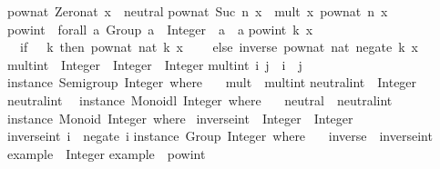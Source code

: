 \begin{isabellebody}
\begin{isamarkuptext}
\begin{typewriter}
pow{\isacharunderscore}nat\ Zero{\isacharunderscore}nat\ x\ {\isacharequal}\ neutral{\isacharsemicolon}\isanewline
pow{\isacharunderscore}nat\ {\isacharparenleft}Suc\ n{\isacharparenright}\ x\ {\isacharequal}\ mult\ x\ {\isacharparenleft}pow{\isacharunderscore}nat\ n\ x{\isacharparenright}{\isacharsemicolon}\isanewline
\isanewline
pow{\isacharunderscore}int\ {\isacharcolon}{\isacharcolon}\ forall\ a{\isachardot}\ {\isacharparenleft}Group\ a{\isacharparenright}\ {\isacharequal}{\isachargreater}\ Integer\ {\isacharminus}{\isachargreater}\ a\ {\isacharminus}{\isachargreater}\ a{\isacharsemicolon}\isanewline
pow{\isacharunderscore}int\ k\ x\ {\isacharequal}\isanewline
\ \ {\isacharparenleft}if\ {}\ {\isacharless}{\isacharequal}\ k\ then\ pow{\isacharunderscore}nat\ {\isacharparenleft}nat\ k{\isacharparenright}\ x\isanewline
\ \ \ \ else\ inverse\ {\isacharparenleft}pow{\isacharunderscore}nat\ {\isacharparenleft}nat\ {\isacharparenleft}negate\ k{\isacharparenright}{\isacharparenright}\ x{\isacharparenright}{\isacharparenright}{\isacharsemicolon}\isanewline
\isanewline
mult{\isacharunderscore}int\ {\isacharcolon}{\isacharcolon}\ Integer\ {\isacharminus}{\isachargreater}\ Integer\ {\isacharminus}{\isachargreater}\ Integer{\isacharsemicolon}\isanewline
mult{\isacharunderscore}int\ i\ j\ {\isacharequal}\ i\ {\isacharplus}\ j{\isacharsemicolon}\isanewline
\isanewline
instance\ Semigroup\ Integer\ where\ {\isacharbraceleft}\isanewline
\ \ mult\ {\isacharequal}\ mult{\isacharunderscore}int{\isacharsemicolon}\isanewline
{\isacharbraceright}{\isacharsemicolon}\isanewline
\isanewline
neutral{\isacharunderscore}int\ {\isacharcolon}{\isacharcolon}\ Integer{\isacharsemicolon}\isanewline
neutral{\isacharunderscore}int\ {\isacharequal}\ {}{\isacharsemicolon}\isanewline
\isanewline
instance\ Monoidl\ Integer\ where\ {\isacharbraceleft}\isanewline
\ \ neutral\ {\isacharequal}\ neutral{\isacharunderscore}int{\isacharsemicolon}\isanewline
{\isacharbraceright}{\isacharsemicolon}\isanewline
\isanewline
instance\ Monoid\ Integer\ where\ {\isacharbraceleft}\isanewline
{\isacharbraceright}{\isacharsemicolon}\isanewline
\isanewline
inverse{\isacharunderscore}int\ {\isacharcolon}{\isacharcolon}\ Integer\ {\isacharminus}{\isachargreater}\ Integer{\isacharsemicolon}\isanewline
inverse{\isacharunderscore}int\ i\ {\isacharequal}\ negate\ i{\isacharsemicolon}\isanewline
\isanewline
instance\ Group\ Integer\ where\ {\isacharbraceleft}\isanewline
\ \ inverse\ {\isacharequal}\ inverse{\isacharunderscore}int{\isacharsemicolon}\isanewline
{\isacharbraceright}{\isacharsemicolon}\isanewline
\isanewline
example\ {\isacharcolon}{\isacharcolon}\ Integer{\isacharsemicolon}\isanewline
example\ {\isacharequal}\ pow{\isacharunderscore}int\ {}{}\ {\isacharparenleft}{\isacharminus}{}{\isacharparenright}{\isacharsemicolon}\isanewline
\isanewline
{\isacharbraceright}\isanewline


\end{typewriter}
\end{isamarkuptext}
\end{isabellebody}
